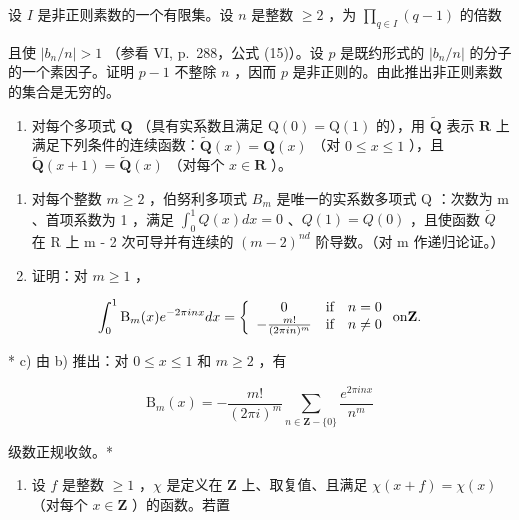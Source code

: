 设 \(I\) 是非正则素数的一个有限集。设 \(n\) 是整数 \(\geqslant 2\) ，为 \(\prod_{q \in I} (q - 1)\) 的倍数

且使 \(|b_n / n| > 1\) （参看 VI, p.~288，公式 (15)）。设 \(p\) 是既约形式的 \(|b_n / n|\) 的分子的一个素因子。证明 \(p - 1\) 不整除 \(n\) ，因而 \(p\) 是非正则的。由此推出非正则素数的集合是无穷的。

\begin{enumerate}
\def\labelenumi{\arabic{enumi})}
\setcounter{enumi}{11}
\tightlist
\item
  对每个多项式 \(\mathbf{Q}\) （具有实系数且满足 \(\mathrm{Q}(0) = \mathrm{Q}(1)\) 的），用 \(\tilde{\mathbf{Q}}\) 表示 \(\mathbf{R}\) 上满足下列条件的连续函数：\(\tilde{\mathbf{Q}}(x) = \mathbf{Q}(x)\) （对 \(0 \leqslant x \leqslant 1\) ），且 \(\tilde{\mathbf{Q}}(x + 1) = \tilde{\mathbf{Q}}(x)\) （对每个 \(x \in \mathbf{R}\) ）。
\end{enumerate}

\begin{enumerate}
\def\labelenumi{\alph{enumi})}
\item
  对每个整数 \(m \geqslant 2\) ，伯努利多项式 \(B_{m}\) 是唯一的实系数多项式 Q ：次数为 m 、首项系数为 1 ，满足 \(\int_{0}^{1} Q(x) dx = 0\) 、\(Q(1) = Q(0)\) ，且使函数 \(\tilde{Q}\) 在 R 上 m - 2 次可导并有连续的 \((m - 2)^{nd}\) 阶导数。（对 m 作递归论证。）
\item
  证明：对 \(m \geqslant 1\) ，
\end{enumerate}

\[
\int_ {0} ^ {1} \mathrm{B} _ {m} (x) e ^ {- 2 \pi i n x} d x = \left\{ \begin{array}{c c c} 0 & \text {if} & n = 0 \\ - \frac {m !}{(2 \pi i n) ^ {m}} & \text {if} & n \neq 0 \end{array} \right. \text {on} \mathbf {Z}.
\]

* c) 由 b) 推出：对 \(0 \leqslant x \leqslant 1\) 和 \(m \geqslant 2\) ，有

\[
\mathrm{B} _ {m} (x) = - \frac {m !}{(2 \pi i) ^ {m}} \sum_ {n \in \mathbf {Z} - \{0 \}} \frac {e ^ {2 \pi i n x}}{n ^ {m}}
\]

级数正规收敛。*

\begin{enumerate}
\def\labelenumi{\arabic{enumi})}
\setcounter{enumi}{12}
\tightlist
\item
  设 \(f\) 是整数 \(\geqslant 1\) ，\(\chi\) 是定义在 \(\mathbf{Z}\) 上、取复值、且满足 \(\chi(x + f) = \chi(x)\) （对每个 \(x \in \mathbf{Z}\) ）的函数。若置
\end{enumerate}

